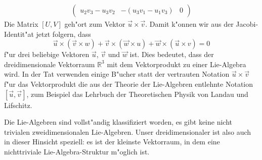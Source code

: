\begin{beispiel}
\begin{align*}
\begin{pmatrix}
u_2v_3 - u_3v_2         
	&-( u_3v_1 - u_1v_3)
		& 0
\end{pmatrix}
\end{align*}
Die Matrix $[U,V]$ geh"ort zum Vektor $\vec u\times\vec v$.
Damit k"onnen wir aus der Jacobi-Identit"at jetzt folgern, dass
\[
\vec u\times(\vec v\times w)
+
\vec v\times(\vec w\times u)
+
\vec w\times(\vec u\times v)
=0
\]
f"ur drei beliebige Vektoren $\vec u$, $\vec v$ und $\vec w$ ist.
Dies bedeutet, dass der dreidimensionale Vektorraum $\mathbb R^3$
mit dem Vektorprodukt zu einer Lie-Algebra wird.
In der Tat verwenden einige B"ucher statt der vertrauten Notation
$\vec u\times \vec v$ f"ur das Vektorprodukt die aus der Theorie der
Lie-Algebren entlehnte Notation $[\vec u,\vec v]$, zum Beispiel
das Lehrbuch der Theoretischen Physik \cite{skript:landaulifschitz1}
von Landau und Lifschitz.

Die Lie-Algebren sind vollst"andig klassifiziert worden, es gibt
keine nicht trivialen zweidimensionalen Lie-Algebren.
Unser dreidimensionaler ist also auch in dieser Hinsicht speziell:
es ist der kleinste Vektorraum, in dem eine nichttriviale Lie-Algebra-Struktur
m"oglich ist.
\end{beispiel}

